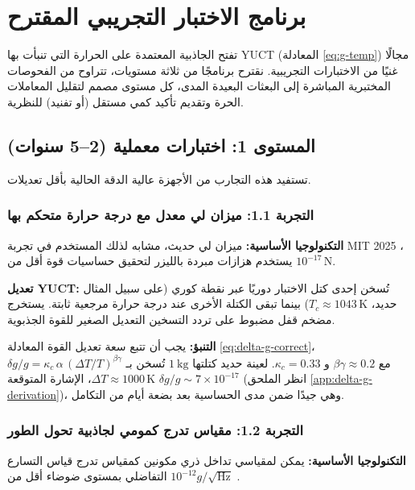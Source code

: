 \documentclass[11pt,a4paper]{article}
\begin{document}
	\section{برنامج الاختبار التجريبي المقترح}
	\label{sec:experiments}
	
	تفتح الجاذبية المعتمدة على الحرارة التي تنبأت بها YUCT (المعادلة \ref{eq:g-temp}) مجالًا غنيًا من الاختبارات التجريبية.
	نقترح برنامجًا من ثلاثة مستويات، تتراوح من الفحوصات المختبرية المباشرة إلى البعثات البعيدة المدى، كل مستوى مصمم لتقليل المعاملات الحرة وتقديم تأكيد كمي مستقل (أو تفنيد) للنظرية.
	
	\subsection{المستوى 1: اختبارات معملية (2–5 سنوات)}
	\label{subsec:lab-tests}
	
	تستفيد هذه التجارب من الأجهزة عالية الدقة الحالية بأقل تعديلات.
	
	\subsubsection{التجربة 1.1: ميزان لي معدل مع درجة حرارة متحكم بها}
	
	\textbf{التكنولوجيا الأساسية:} ميزان لي حديث، مشابه لذلك المستخدم في تجربة MIT 2025 \cite{MIT2025}، يستخدم هزازات مبردة بالليزر لتحقيق حساسيات قوة أقل من $10^{-17}\,\mathrm{N}$.
	
	\textbf{تعديل YUCT:} تُسخن إحدى كتل الاختبار دوريًا عبر نقطة كوري (على سبيل المثال حديد، $T_c\approx1043\,\mathrm{K}$) بينما تبقى الكتلة الأخرى عند درجة حرارة مرجعية ثابتة. يستخرج مضخم قفل مضبوط على تردد التسخين التعديل الصغير للقوة الجذبوية.
	
	\textbf{التنبؤ:} يجب أن تتبع سعة تعديل القوة المعادلة \ref{eq:delta-g-correct}، $\delta g/g = \kappa_c\,\alpha\,(\Delta T/T)^{\beta\gamma}$ مع $\beta\gamma\approx0.2$ و $\kappa_c=0.33$. لعينة حديد كتلتها $1\ \mathrm{kg}$ تُسخن بـ $\Delta T\approx1000\,\mathrm{K}$، الإشارة المتوقعة $\delta g/g \sim 7\times10^{-17}$ (انظر الملحق \ref{app:delta-g-derivation})، وهي جيدًا ضمن مدى الحساسية بعد بضعة أيام من التكامل.
	
	\subsubsection{التجربة 1.2: مقياس تدرج كمومي لجاذبية تحول الطور}
	
	\textbf{التكنولوجيا الأساسية:} يمكن لمقياسي تداخل ذري مكونين كمقياس تدرج قياس التسارع التفاضلي بمستوى ضوضاء أقل من $10^{-12}g/\sqrt{\mathrm{Hz}}$ \cite{Snadden1998}.
	
\end{document}
